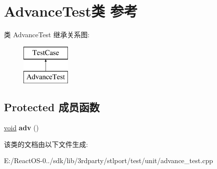 \hypertarget{class_advance_test}{}\section{Advance\+Test类 参考}
\label{class_advance_test}
类 Advance\+Test 继承关系图\+:\begin{figure}[H]
\begin{center}
\leavevmode
\includegraphics[height=2.000000cm]{class_advance_test}
\end{center}
\end{figure}
\subsection*{Protected 成员函数}
\begin{DoxyCompactItemize}
\item 
\mbox{\label{class_advance_test_a001abce56e1d02b5c20f38cf3503f7f2}} 
\hyperlink{interfacevoid}{void} {\bfseries adv} ()
\end{DoxyCompactItemize}


该类的文档由以下文件生成\+:\begin{DoxyCompactItemize}
\item 
E\+:/\+React\+O\+S-\/0../sdk/lib/3rdparty/stlport/test/unit/advance\+\_\+test.\+cpp\end{DoxyCompactItemize}
